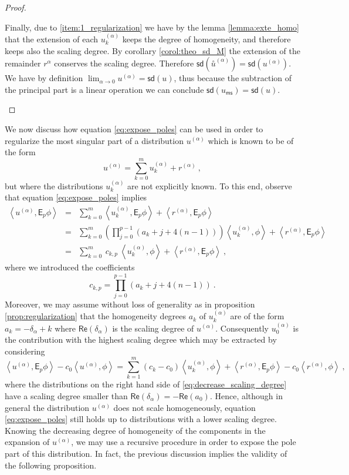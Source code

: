 \documentclass[11pt]{book}
\newcommand{\ms}{\mathsf{ms}}
\newcommand{\sd}{\mathsf{sd}}
\renewcommand{\Re}{\mathsf{Re}}
\newcommand{\sm}[1]{\left\langle#1\right\rangle}
\newcommand{\exte}[1]{\overset{\circ}{#1}}
\newcommand{\Esf}{\mathsf{E}}
\theoremstyle{break}
\begin{document}
\begin{proof}
\begin{description}
%
Finally, due to \ref{item:1_regularization} we have by the lemma \ref{lemma:exte_homo} that the extension of each $u^{(\alpha)}_k$ keeps the degree of homogeneity, and therefore keeps also the scaling degree. By corollary \ref{corol:theo_sd_M} the extension of the remainder $r^\alpha$ conserves the scaling degree. Therefore $\sd(\exte{u}^{(\alpha)})=\sd(u^{(\alpha)})$. We have by definition $\lim_{\alpha\to 0}u^{(\alpha)} = \sd(u)$, thus because the subtraction of the principal part is a linear operation we can conclude $\sd(u_\ms)=\sd(u)$.
%
%
\end{description}
\end{proof}


We now discuss how equation \eqref{eq:expose_poles} can be used in order to regularize the most singular part of a distribution $u^{(\alpha)}$ which is known to be of the form
%
\begin{equation*}
u^{(\alpha)} = \sum_{k=0}^m u^{(\alpha)}_k + r^{(\alpha)} \ ,
\end{equation*}
%
but where the distributions $u^{(\alpha)}_k$ are not explicitly known. To this end, observe that equation \eqref{eq:expose_poles} implies
%
\begin{eqnarray*}
\sm{ u^{(\alpha)} , \Esf_p \phi } &=& \sum_{k=0}^m \sm{u^{(\alpha)}_k , \Esf_p \phi } + \sm{r^{(\alpha)} , \Esf_p \phi } \\
&=& \sum_{k=0}^m \left( \prod_{j=0}^{p-1} (a_k+j+4(n-1)) \right) \sm{ u^{(\alpha)}_k , \phi } + \sm{ r^{(\alpha)} , \Esf_p \phi } \\
&=& \sum_{k=0}^m \ c_{k,p} \ \sm{ u^{(\alpha)}_k , \phi } + \sm{ r^{(\alpha)} , \Esf_p \phi } \ ,
\end{eqnarray*}
%
where we introduced the coefficients
%
\begin{equation*}
c_{k,p} = \prod_{j=0}^{p-1} \left(a_k+j+4(n-1)\right) \ .
\end{equation*}
%
Moreover, we may assume without loss of generality as in proposition \ref{prop:regularization} that the homogeneity degrees $a_k$ of $u^{(\alpha)}_k$ are of the form $a_k = -\delta_\alpha + k$ where $\Re(\delta_\alpha)$ is the scaling degree of $u^{(\alpha)}$. Consequently $u^{(\alpha)}_0$ is the contribution with the highest scaling degree which may be extracted by considering
%
\begin{equation}
\sm{ u^{(\alpha)} , \Esf_p \phi } - c_0 \sm{ u^{(\alpha)} , \phi } = \sum_{k=1}^m (c_k-c_0) \sm{ u^{(\alpha)}_k , \phi } + \sm{ r^{(\alpha)} , \Esf_p \phi } - c_0 \sm{ r^{(\alpha)}, \phi } \ ,
\label{eq:decrease_scaling_degree}
\end{equation}
%
where the distributions on the right hand side of \eqref{eq:decrease_scaling_degree} have a scaling degree smaller than $\Re(\delta_\alpha) = - \Re (a_0)$. Hence, although in general the distribution $u^{(\alpha)}$ does not scale homogeneously, equation \eqref{eq:expose_poles} still holds up to distributions with a lower scaling degree. Knowing the decreasing degree of homogeneity of the components in the expansion of $u^{(\alpha)}$, we may use a recursive procedure in order to expose the pole part of this distribution. In fact, the previous discussion implies the validity of the following proposition.
\end{document}
